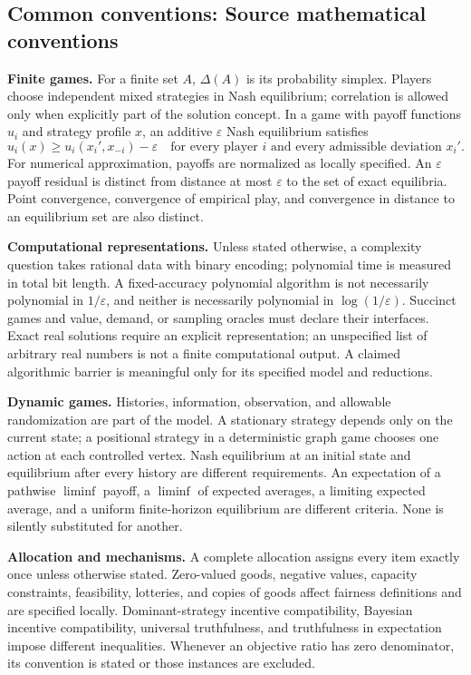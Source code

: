 \documentclass[11pt,a4paper]{article}
\begin{document}
\par\endgroup

\subsection*{Common conventions: Source mathematical conventions}

\textbf{Finite games.} For a finite set $A$, $\Delta(A)$ is its probability
simplex. Players choose independent mixed strategies in Nash equilibrium;
correlation is allowed only when explicitly part of the solution concept.
In a game with payoff functions $u_i$ and strategy profile $x$, an additive
$\varepsilon$ Nash equilibrium satisfies
\[
 u_i(x)\geq u_i(x_i',x_{-i})-\varepsilon
 \quad\text{for every player $i$ and every admissible deviation $x_i'$}.
\]
For numerical approximation, payoffs are normalized as locally specified.
An $\varepsilon$ payoff residual is distinct from distance at most
$\varepsilon$ to the set of exact equilibria. Point convergence, convergence
of empirical play, and convergence in distance to an equilibrium set are
also distinct.

\textbf{Computational representations.} Unless stated otherwise, a complexity
question takes rational data with binary encoding; polynomial time is measured
in total bit length. A fixed-accuracy polynomial algorithm is not necessarily
polynomial in $1/\varepsilon$, and neither is necessarily polynomial in
$\log(1/\varepsilon)$. Succinct games and value, demand, or sampling oracles
must declare their interfaces. Exact real solutions require an explicit
representation; an unspecified list of arbitrary real numbers is not a
finite computational output. A claimed algorithmic barrier is meaningful
only for its specified model and reductions.

\textbf{Dynamic games.} Histories, information, observation, and allowable
randomization are part of the model. A stationary strategy depends only on
the current state; a positional strategy in a deterministic graph game
chooses one action at each controlled vertex. Nash equilibrium at an initial
state and equilibrium after every history are different requirements.
An expectation of a pathwise $\liminf$ payoff, a $\liminf$ of expected averages,
a limiting expected average, and a uniform finite-horizon equilibrium are
different criteria. None is silently substituted for another.

\textbf{Allocation and mechanisms.} A complete allocation assigns every item
exactly once unless otherwise stated. Zero-valued goods, negative values,
capacity constraints, feasibility, lotteries, and copies of goods affect
fairness definitions and are specified locally. Dominant-strategy incentive
compatibility, Bayesian incentive compatibility, universal truthfulness,
and truthfulness in expectation impose different inequalities. Whenever
an objective ratio has zero denominator, its convention is stated or those
instances are excluded.
\end{document}
